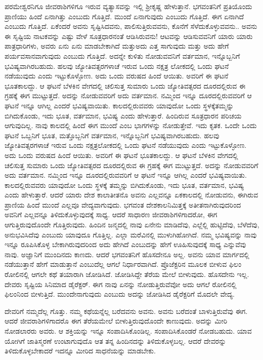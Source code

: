 ಪರಮೇಶ್ವರನಿಗೂ ಜೀವರಾಶಿಗಳಿಗೂ ಇರುವ ವ್ಯತ್ಯಾಸವನ್ನು ಇಲ್ಲಿ ಶ‍್ರೀಕೃಷ್ಣ ಹೇಳುತ್ತಾನೆ. ಭಗವಂತನಿಗೆ ಪ್ರತಿಯೊಂದು ಪ್ರಾಣಿಯು ಹಿಂದೆ ಏನಾಗಿತ್ತು ಎಂಬುದು ಗೊತ್ತಿದೆ. ಮುಂದೆ ಏನಾಗುವುದು ಎಂಬುದು ಗೊತ್ತಿದೆ. ಈಗ ಏನಾಗಿದೆ ಎಂಬುದು ಗೊತ್ತಿದೆ. ಏಕೆಂದರೆ ಅವನು ಸೃಷ್ಟಿಸಿದವನು, ಪಾಲಿಸುತ್ತಿರುವವನು, ಕೊನೆಗೆ ಸೆಳೆದುಕೊಳ್ಳುವವನು.. ಅವನು ಈ ಸೃಷ್ಟಿಯ ನಾಟಕವನ್ನು ಎಷ್ಟು ವೇಳೆ ಸೂತ್ರಧಾರನಂತೆ ಆಡಿಸಿರುವನು! ಆಟವನ್ನು ಆಡಿಸುವವನಿಗೆ ಯಾರು ಯಾರು ಪಾತ್ರಧಾರಿಗಳು, ಅವರು ಏನು ಏನು ಮಾಡಬೇಕಾಗಿದೆ ಮತ್ತುಅದು ಎತ್ತ ಸಾಗುವುದು ಮತ್ತು ಅದು ಹೇಗೆ ಪರ್ಯವಸಾನವಾಗುವುದು ಎಂಬುದು ಗೊತ್ತಿದೆ. ಅದನ್ನೇ ಕುಳಿತು ನೋಡುವವನಿಗೆ ವರ್ತಮಾನ, ಇನ್ನೊಬ್ಬನಿಗೆ ಭವಿಷ್ಯವಾಗಿರಬಹುದು. ಹಲವು ಜ್ಯೋತಿವತ್ಸರ\-ಗಳಾಚೆ ಇರುವ ಒಂದು ನಕ್ಷತ್ರ ಲೋಕದಲ್ಲಿ ಒಂದು ಘಟನೆ ನಡೆಯುವುದು ಎಂದು ಇಟ್ಟು\-ಕೊಳ್ಳೋಣ. ಅದು ಒಂದು ವರುಷದ ಹಿಂದೆ ಆಯಿತು. ಅವರಿಗೆ ಈ ಘಟನೆ ಭೂತಕಾಲದ್ದು. ಆ ಘಟನೆ ಬೆಳಕಿನ ವೇಗದಲ್ಲಿ ಚಲಿಸುತ್ತ ಸುಮಾರು ಒಂದು ಜ್ಯೋತಿವತ್ಸರದ ದೂರದಲ್ಲಿರುವ ಈ ಗ್ರಹಕ್ಕೆ ಈಗ ಮುಟ್ಟುತ್ತದೆ. ಅದನ್ನು ನೋಡುವವರಿಗೆ ಅದು ವರ್ತಮಾನ. ನಮ್ಮಿಂದ ಇನ್ನೂ ದೂರದಲ್ಲಿರುವವರಿಗೆ ಆ ಘಟನೆ ಇನ್ನೂ ಆಗಿಲ್ಲ ಎಂದರೆ ಭವಿಷ್ಯವಾಯಿತು. ಕಾಲದಲ್ಲಿರುವವರು ಯಾವುದೋ ಒಂದು ಸ್ಥಳಕ್ಕೆತಮ್ಮನ್ನು ಬಿಗಿದುಕೊಂಡು, ಇದು ಭೂತ, ವರ್ತಮಾನ, ಭವಿಷ್ಯ ಎಂದು ಹೇಳುತ್ತಾರೆ. ಹಿಂದಿರುವ ಸೂತ್ರಧಾರನ ಪರಿಚಯ ಆಗುವುದಿಲ್ಲ. ನಾವು ಕಾಲದಲ್ಲಿ ಹಿಂದೆ ಈಗ ಮುಂದೆ ಎಂಬ ಭಾಗಗಳನ್ನು ನೋಡುತ್ತೇವೆ. ಇದು ಕೃತಕ. ಒಂದೇ ಒಂದು ಘಟನೆ ಒಬ್ಬನಿಗೆ ಭೂತ, ಮತ್ತೊಬ್ಬನಿಗೆ ವರ್ತಮಾನ, ಇನ್ನೊಬ್ಬನಿಗೆ ಭವಿಷ್ಯವಾಗಿರಬಹುದು. ಹಲವು ಜ್ಯೋತಿವತ್ಸರಗಳಾಚೆ ಇರುವ ಒಂದು ನಕ್ಷತ್ರಲೋಕದಲ್ಲಿ ಒಂದು ಘಟನೆ ನಡೆಯುವುದು ಎಂದು ಇಟ್ಟುಕೊಳ್ಳೋಣ. ಅದು ಒಂದು ವರುಷದ ಹಿಂದೆ ಆಯಿತು. ಅವರಿಗೆ ಈ ಘಟನೆ ಭೂತಕಾಲದ್ದು. ಆ ಘಟನೆ ಬೆಳಕಿನ ವೇಗದಲ್ಲಿ ಚಲಿಸುತ್ತ ಸುಮಾರು ಒಂದು ಜ್ಯೋತಿವತ್ಸರದ ದೂರದಲ್ಲಿರುವ ಈ ಗ್ರಹಕ್ಕೆ ಈಗ ಮುಟ್ಟುತ್ತದೆ. ಅದನ್ನು ನೋಡುವವರಿಗೆ ಅದು ವರ್ತಮಾನ. ನಮ್ಮಿಂದ ಇನ್ನೂ ದೂರದಲ್ಲಿರುವವರಿಗೆ ಆ ಘಟನೆ ಇನ್ನೂ ಆಗಿಲ್ಲ ಎಂದರೆ ಭವಿಷ್ಯವಾಯಿತು. ಕಾಲದಲ್ಲಿರುವವರು ಯಾವುದೋ ಒಂದು ಸ್ಥಳಕ್ಕೆ ತಮ್ಮನ್ನು ಬಿಗಿದುಕೊಂಡು, ಇದು ಭೂತ, ವರ್ತಮಾನ, ಭವಿಷ್ಯ ಎಂದು ಹೇಳುತ್ತಾರೆ. ಆದರೆ ಯಾರು ದೇಶ ಕಾಲಾತೀತನೊ ಅವನು ಎಲ್ಲವನ್ನೂ ಏಕಕಾಲದಲ್ಲಿ ನೋಡುವನು, ಈಗಿರುವ ಪ್ರಾಣಿಯ ಹಿಂದೆ ಮುಂದೆ ಎಲ್ಲವೂ ವೇದ್ಯವಾಗುವುದು. ಭಗವಂತ ದೇಶಕಾಲನಿಮಿತ್ತಕ್ಕೆ ಅತೀತನಾಗಿರುವುದರಿಂದ ಅವನಿಗೆ ಎಲ್ಲವನ್ನೂ ತಿಳಿದುಕೊಳ್ಳುವುದಕ್ಕೆ ಸಾಧ್ಯ. ಆದರೆ ಸಾಧಾರಣ ಜೀವರಾಶಿಗಳಿಗಾದರೋ, ಈಗ ಆಗುತ್ತಿರುವುದೊಂದೇ ಗೊತ್ತಿರುವುದು. ಹಿಂದಿನ ಜನ್ಮದಲ್ಲಿ ನಾವು ಏನೇನು ಮಾಡಿದೆವು, ಎಲ್ಲೆಲ್ಲಿ ಹುಟ್ಟಿದೆವು, ಬೆಳೆದೆವು, ಅನುಭವಿಸಿದೆವು ಎಂಬುದು ಯಾವುದೂ ಗೊತ್ತಿಲ್ಲ. ಎಲ್ಲಾ ಮರೆವಿನಲ್ಲಿ ಮುಳುಗಿಹೋಗಿದೆ. ನಮ್ಮ ಭವಿಷ್ಯವನ್ನು ನಾವು ಇನ್ನೂ ರೂಪಿಸಿಕೊಳ್ಳ ಬೇಕಾಗಿರುವುದರಿಂದ ಅದು ಹೇಗಿದೆ ಎಂಬುದನ್ನು ಹೇಗೆ ಊಹಿಸುವುದಕ್ಕೆ ಸಾಧ್ಯ ಎನ್ನುವೆವು ನಾವು. ಅಜ್ಞಾನಿಗೆ ಮುಂದಿನದು ಕಾಣದು. ಆದರೆ ಭಗವಂತನಿಗೆ ಹೊಸದೇನೂ ಅಲ್ಲ. ಅವನು ಯಾವ ಮಾರ್ಗದಲ್ಲಿ ನಡೆಯುತ್ತಾನೆ ಹೇಗೆ ಮಾಡುತ್ತಾನೆ ಎಂಬುದೆಲ್ಲ ಆಗಲೆ ನಿರ್ಧಾರವಾಗಿದೆ. ಪ್ರೊಜೆಕ್ಟರಿನ ಮೂಲಕ ಬೀಳುವ ಫಿಲಂ ರೋಲಿನಲ್ಲಿ ಆಗಲೇ ಕಥೆ ತಯಾರಾಗಿ ಜೋಡಿಸಿದೆ. ಜೋಡಿಸಿದ್ದೇ ತೆರೆಯ ಮೇಲೆ ಬೀಳುವುದು. ಹೊಸದೇನು ಇಲ್ಲ. ದೇವರು ಸೃಷ್ಟಿಯ ಸಿನಿಮಾದ ಡೈರೆಕ್ಟರ್. ಈಗ ನಾವು ಏನನ್ನು ನೋಡುತ್ತಿರುವೆವೋ ಅದು ಆಗಲೆ ರೋಲಿನಲ್ಲಿ ಫಿಲಂನಿಂದ ಬೀಳುತ್ತಿದೆ. ಮುಂದೇನಾಗುವುದು ಎಂಬುದು ಅದನ್ನು ಜೋಡಿಸಿದ ಡೈರೆಕ್ಟರಿಗೆ ಮೊದಲೇ ವೇದ್ಯ.

ದೇವರಿಗೆ ನಮ್ಮದೆಲ್ಲ ಗೊತ್ತು. ನಮ್ಮ ಕಥೆಯನ್ನೆಲ್ಲ ಬರೆದವನು ಅವನು. ಅವನು ಬರೆದಂತೆ ಬಾಳುತ್ತಿರುವೆವು ಈಗ. ಆದರೆ ಜೀವರಾಶಿಗಳಿಗಾದರೊ ಈಗ ತೆರೆಯಮೇಲೆ ಬೀಳುತ್ತಿರುವು\-ದೊಂದೇ ಕಾಣುವುದು. ಅದನ್ನು ಮೀರಿ ನೋಡಲಾರರು ಅವರು. ಆ ಶಕ್ತಿಯನ್ನು ಇನ್ನೂ ಸಂಪಾದಿಸಿಕೊಂಡಿಲ್ಲ. ಸಂಪಾದಿಸಿಕೊಂಡರೆ ನೋಡಬಹುದು. ಯಾವ ಯೋಗಿಗೆ ಜಾತಿಸ್ಮರಣೆ ಉಂಟಾಗುವುದೊ ಆತ ತನ್ನ ಹಿಂದಿನದನ್ನು ತಿಳಿದುಕೊಳ್ಳಬಲ್ಲ. ಆದರೆ ದೇವರನ್ನು ತಿಳಿದುಕೊಳ್ಳ\-ಬೇಕಾದರೆ ಇದನ್ನೂ ಮೀರಿದ ಸಾಧನೆಯನ್ನು ಮಾಡಬೇಕು.


